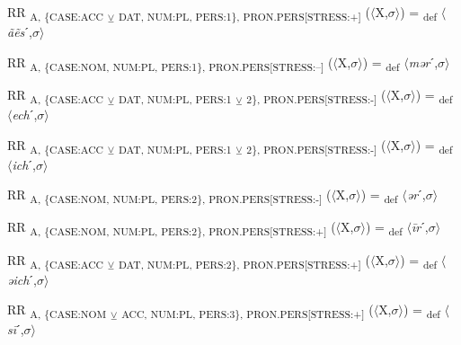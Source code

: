 {\begin{exe}
 RR \textsubscript{A, \{CASE:ACC} \textsubscript{${\veebar}$}\textsubscript{ DAT, NUM:PL, PERS:1\}, PRON.PERS[STRESS:+]} ($\langle$X,$\sigma $$\rangle$) = \textsubscript{def} $\langle$\textit{ãẽs}ˊ,$\sigma $$\rangle$
\end{exe}

\begin{exe}
 RR \textsubscript{A, \{CASE:NOM, NUM:PL, PERS:1\}, PRON.PERS[STRESS:–]} ($\langle$X,$\sigma $$\rangle$) = \textsubscript{def} $\langle$\textit{mər}ˊ,$\sigma $$\rangle$
\end{exe}

\begin{exe}
 RR \textsubscript{A, \{CASE:ACC} \textsubscript{${\veebar}$}\textsubscript{ DAT, NUM:PL, PERS:1} \textsubscript{${\veebar}$}\textsubscript{ 2\}, PRON.PERS[STRESS:-]} ($\langle$X,$\sigma $$\rangle$) = \textsubscript{def} $\langle$\textit{ech}ˊ,$\sigma $$\rangle$
\end{exe}

\begin{exe}
 RR \textsubscript{A, \{CASE:ACC} \textsubscript{${\veebar}$}\textsubscript{ DAT, NUM:PL, PERS:1} \textsubscript{${\veebar}$}\textsubscript{ 2\}, PRON.PERS[STRESS:-]} ($\langle$X,$\sigma $$\rangle$) = \textsubscript{def} $\langle$\textit{ich}ˊ,$\sigma $$\rangle$
\end{exe}

\begin{exe}
 RR \textsubscript{A, \{CASE:NOM, NUM:PL, PERS:2\}, PRON.PERS[STRESS:-]} ($\langle$X,$\sigma $$\rangle$) = \textsubscript{def} $\langle$\textit{ər}ˊ,$\sigma $$\rangle$
\end{exe}

\begin{exe}
 RR \textsubscript{A, \{CASE:NOM, NUM:PL, PERS:2\}, PRON.PERS[STRESS:+]} ($\langle$X,$\sigma $$\rangle$) = \textsubscript{def} $\langle$\textit{\=ir}ˊ,$\sigma $$\rangle$
\end{exe}

\begin{exe}
 RR \textsubscript{A, \{CASE:ACC} \textsubscript{${\veebar}$}\textsubscript{ DAT, NUM:PL, PERS:2\}, PRON.PERS[STRESS:+]} ($\langle$X,$\sigma $$\rangle$) = \textsubscript{def} $\langle$\textit{əich}ˊ,$\sigma $$\rangle$
\end{exe}

\begin{exe}
 RR \textsubscript{A, \{CASE:NOM} \textsubscript{${\veebar}$}\textsubscript{ ACC, NUM:PL, PERS:3\}, PRON.PERS[STRESS:+]} ($\langle$X,$\sigma $$\rangle$) = \textsubscript{def} $\langle$\textit{s\=i}ˊ,$\sigma $$\rangle$
\end{exe}

}
